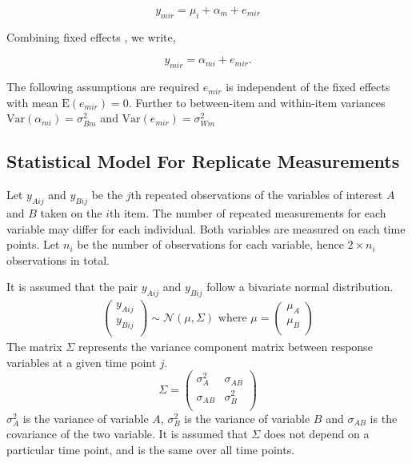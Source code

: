 \documentclass[12pt, a4paper]{report}
\theoremstyle{plain}
\theoremstyle{definition}
\theoremstyle{remark}
\begin{document}
\[ y_{mir} = \mu_{i} + \alpha_{m} + e_{mir}  \]

Combining fixed effects \citep{barnhart}, we write,

\[ y_{mir} = \alpha_{mi} + e_{mir}.\]

The following assumptions are required
$e_{mir}$ is independent of the fixed effects with mean $\mbox{E}(e_{mir}) = 0$.
Further to \citet{barnhart} between-item and within-item variances $\mbox{Var}(\alpha_{mi}) = \sigma^2_{Bm}$ and $\mbox{Var}(e_{mir}) = \sigma^2_{Wm}$		

\subsection{Statistical Model For Replicate Measurements}
Let $y_{Aij}$ and $y_{Bij}$ be the $j$th repeated observations of the variables of interest $A$ and $B$ taken on the $i$th item. The number of repeated measurements for each variable may differ for each individual.
Both variables are measured on each time points. Let $n_{i}$ be the number of observations for each variable, hence $2\times n_{i}$ observations in total.

It is assumed that the pair $y_{Aij}$ and $y_{Bij}$ follow a bivariate normal distribution.
\begin{eqnarray}
\left(
\begin{array}{c}
y_{Aij} \\
y_{Bij} \\
\end{array}
\right) \sim \mathcal{N}(
{\mu}, {\Sigma})\mbox{   where } {\mu} = \left(
\begin{array}{c}
\mu_{A} \\
\mu_{B} \\
\end{array}
\right)
\end{eqnarray}
The matrix ${\Sigma}$ represents the variance component matrix between response variables at a given time point $j$.
\begin{equation}
{\Sigma} = \left( \begin{array}{cc}
\sigma^2_{A} & \sigma_{AB} \\
\sigma_{AB} & \sigma^2_{B}\\
\end{array}\right)
\end{equation}
$\sigma^2_{A}$ is the variance of variable $A$, $\sigma^2_{B}$ is the variance of variable $B$ and $\sigma_{AB}$ is the covariance of the two variable. It is assumed that ${\Sigma}$ does not depend on a particular time point, and is the same over all time points.
\end{document}
